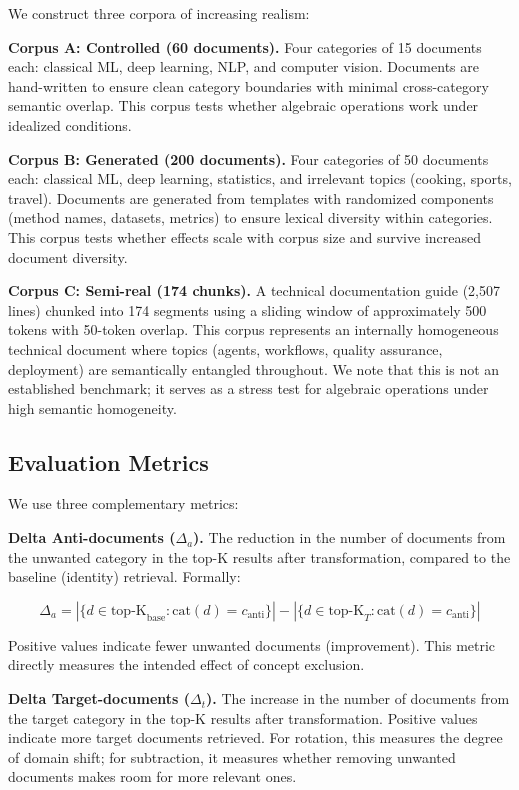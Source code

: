 \documentclass{article}
\begin{document}
We construct three corpora of increasing realism:

\textbf{Corpus A: Controlled (60 documents).} Four categories of 15 documents each: classical ML, deep learning, NLP, and computer vision. Documents are hand-written to ensure clean category boundaries with minimal cross-category semantic overlap. This corpus tests whether algebraic operations work under idealized conditions.

\textbf{Corpus B: Generated (200 documents).} Four categories of 50 documents each: classical ML, deep learning, statistics, and irrelevant topics (cooking, sports, travel). Documents are generated from templates with randomized components (method names, datasets, metrics) to ensure lexical diversity within categories. This corpus tests whether effects scale with corpus size and survive increased document diversity.

\textbf{Corpus C: Semi-real (174 chunks).} A technical documentation guide (2,507 lines) chunked into 174 segments using a sliding window of approximately 500 tokens with 50-token overlap. This corpus represents an internally homogeneous technical document where topics (agents, workflows, quality assurance, deployment) are semantically entangled throughout. We note that this is not an established benchmark; it serves as a stress test for algebraic operations under high semantic homogeneity.

\subsection{Evaluation Metrics}

We use three complementary metrics:

\textbf{Delta Anti-documents ($\Delta_a$).} The reduction in the number of documents from the unwanted category in the top-K results after transformation, compared to the baseline (identity) retrieval. Formally:

\begin{equation}
\Delta_a = |\{d \in \text{top-K}_{\text{base}} : \text{cat}(d) = c_{\text{anti}}\}| - |\{d \in \text{top-K}_{T} : \text{cat}(d) = c_{\text{anti}}\}|
\end{equation}

Positive values indicate fewer unwanted documents (improvement). This metric directly measures the intended effect of concept exclusion.

\textbf{Delta Target-documents ($\Delta_t$).} The increase in the number of documents from the target category in the top-K results after transformation. Positive values indicate more target documents retrieved. For rotation, this measures the degree of domain shift; for subtraction, it measures whether removing unwanted documents makes room for more relevant ones.
\end{document}
